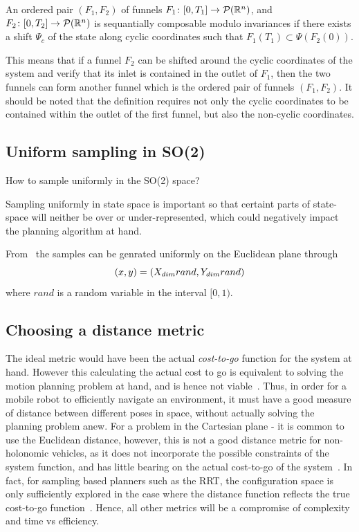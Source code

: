 \begin{definition}
  An ordered pair \((F_1,F_2)\) of funnels \(F_1 \colon [0,T_1] \rightarrow
  \mathcal{P}(\mathbb{R}^n)\), and \(F_2 \colon [0,T_2] \rightarrow \mathcal{P}(\mathbb{R}^n)\)
  is sequantially composable modulo invariances if there exists a shift
  \(\Psi_c\) of the state along cyclic coordinates such that \(F_1(T_1) \subset
  \Psi(F_2(0))\).
\end{definition}

This means that if a funnel \(F_2\) can be shifted around the cyclic coordinates
of the system and verify that its inlet is contained in the outlet of \(F_1\),
then the two funnels can form another funnel which is the ordered pair of
funnels \((F_1,F_2)\). It should be noted that the definition requires not only
the cyclic coordinates to be contained within the outlet of the first funnel,
but also the non-cyclic coordinates.

\subsection{Uniform sampling in SO(2)}

How to sample uniformly in the SO(2) space?

Sampling uniformly in state space is important so that certaint parts of
state-space will neither be over or under-represented, which could negatively
impact the planning algorithm at hand.

From~\cite{kuffnerEffectiveSamplingDistance2004} the samples can be genrated
uniformly on the Euclidean plane through
\[
  (x,y) = (\mathnormal{X}_{dim}rand, \mathnormal{Y}_{dim}rand)
\]
where \(rand\) is a random variable in the interval \([0,1)\).

\subsection{Choosing a distance metric}

The ideal metric would have been the actual \textit{cost-to-go} function for the
system at hand. However this calculating the actual cost to go is equivalent to
solving the motion planning problem at hand, and is hence not
viable~\cite{pengchengReducingMetricSensitivity2001}. Thus, in order for a
mobile robot to efficiently navigate an environment, it must have a good measure
of distance between different poses in space, without actually solving the
planning problem anew. For a problem in the Cartesian plane - it is common to
use the Euclidean distance, however, this is not a good distance metric for
non-holonomic vehicles, as it does not incorporate the possible constraints of
the system function, and has little bearing on the actual cost-to-go of the
system~\cite{parkFeedbackMotionPlanning2015}. In fact, for sampling based
planners such as the \ac{RRT}, the configuration space is only sufficiently
explored in the case where the distance function reflects the true cost-to-go
function~\cite{pengchengReducingMetricSensitivity2001}. Hence, all other metrics
will be a compromise of complexity and time vs efficiency.

